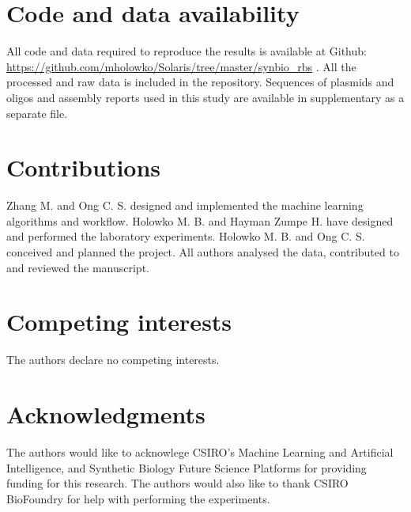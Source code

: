 \documentclass{article}
\begin{document}


\section*{Code and data availability}

All code and data required to reproduce the results is available at Github: \url{https://github.com/mholowko/Solaris/tree/master/synbio_rbs} .
All the processed and raw data is included in the repository.
Sequences of plasmids and oligos and assembly reports used in this study are available in supplementary as a separate file.

\section*{Contributions}
Zhang M. and Ong C. S. designed and implemented the machine learning algorithms and workflow. Holowko M. B. and Hayman Zumpe H. have designed and performed the laboratory experiments. Holowko M. B. and Ong C. S. conceived and planned the project. All authors analysed the data, contributed to and reviewed the manuscript.

\section*{Competing interests}
The authors declare no competing interests.

\section*{Acknowledgments}
The authors would like to acknowlege CSIRO's Machine Learning and Artificial Intelligence, and Synthetic Biology Future Science Platforms for providing funding for this research. The authors would also like to thank CSIRO BioFoundry for help with performing the experiments.


\newpage

\printbibliography

\clearpage

\setcounter{figure}{0}
\makeatletter 
\renewcommand{\thefigure}{S\@arabic\c@figure}
\makeatother
\appendix

\end{document}
